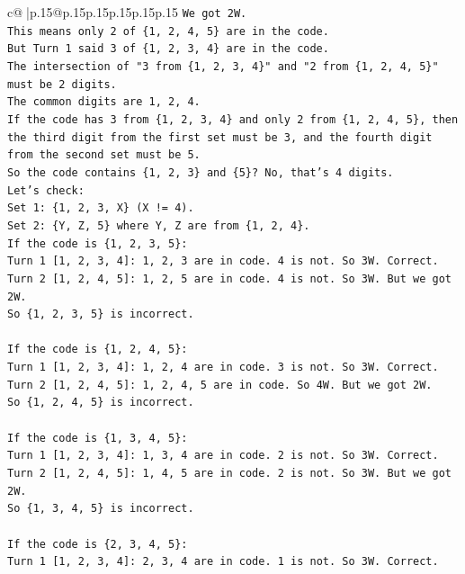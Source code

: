 \documentclass{article}
\begin{document}
{\begin{supertabular}{c@{$\;$}|p{.15\linewidth}@{}p{.15\linewidth}p{.15\linewidth}p{.15\linewidth}p{.15\linewidth}p{.15\linewidth}}
{{{\texttt{We got 2W.} \\
\texttt{This means only 2 of \{1, 2, 4, 5\} are in the code.} \\
\texttt{But Turn 1 said 3 of \{1, 2, 3, 4\} are in the code.} \\
\texttt{The intersection of "3 from \{1, 2, 3, 4\}" and "2 from \{1, 2, 4, 5\}" must be 2 digits.} \\
\texttt{The common digits are 1, 2, 4.} \\
\texttt{If the code has 3 from \{1, 2, 3, 4\} and only 2 from \{1, 2, 4, 5\}, then the third digit from the first set must be 3, and the fourth digit from the second set must be 5.} \\
\texttt{So the code contains \{1, 2, 3\} and \{5\}? No, that's 4 digits.} \\
\texttt{Let's check:} \\
\texttt{Set 1: \{1, 2, 3, X\} (X != 4).} \\
\texttt{Set 2: \{Y, Z, 5\} where Y, Z are from \{1, 2, 4\}.} \\
\texttt{If the code is \{1, 2, 3, 5\}:} \\
\texttt{Turn 1 {[}1, 2, 3, 4{]}: 1, 2, 3 are in code. 4 is not. So 3W. Correct.} \\
\texttt{Turn 2 {[}1, 2, 4, 5{]}: 1, 2, 5 are in code. 4 is not. So 3W. But we got 2W.} \\
\texttt{So \{1, 2, 3, 5\} is incorrect.} \\
\\ 
\texttt{If the code is \{1, 2, 4, 5\}:} \\
\texttt{Turn 1 {[}1, 2, 3, 4{]}: 1, 2, 4 are in code. 3 is not. So 3W. Correct.} \\
\texttt{Turn 2 {[}1, 2, 4, 5{]}: 1, 2, 4, 5 are in code. So 4W. But we got 2W.} \\
\texttt{So \{1, 2, 4, 5\} is incorrect.} \\
\\ 
\texttt{If the code is \{1, 3, 4, 5\}:} \\
\texttt{Turn 1 {[}1, 2, 3, 4{]}: 1, 3, 4 are in code. 2 is not. So 3W. Correct.} \\
\texttt{Turn 2 {[}1, 2, 4, 5{]}: 1, 4, 5 are in code. 2 is not. So 3W. But we got 2W.} \\
\texttt{So \{1, 3, 4, 5\} is incorrect.} \\
\\ 
\texttt{If the code is \{2, 3, 4, 5\}:} \\
\texttt{Turn 1 {[}1, 2, 3, 4{]}: 2, 3, 4 are in code. 1 is not. So 3W. Correct.} \\
}}}
\end{supertabular}}
\end{document}
